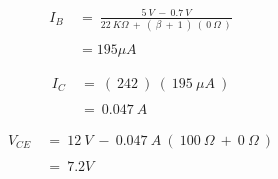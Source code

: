 {\bfseries\itshape{}} 

\begin{flushright}
{\bfseries\itshape{}} \hfill \break
\end{flushright}

\begin{ceqn}
\begin{align}
I_{B}\ &=\ \frac{5\ V\ -\ 0.7\ V}{22\ K\Omega\ +\ (\ \beta\ +\ 1\ )\ (\ 0\ \Omega\ )} \\ \\
&= 195 \mu A
\end{align}
\end{ceqn} \hfill \break

{\bfseries\itshape{}} 

\begin{flushright}
{\bfseries\itshape{}} \hfill \break
\end{flushright}

\begin{ceqn}
\begin{align}
I_{C}\ &=\ (\ 242\ )\ (\ 195\ \mu A\ ) \\ \\
&=\ 0.047\ A
\end{align}
\end{ceqn} \hfill \break

{\bfseries\itshape{}} 

\begin{flushright}
{\bfseries\itshape{}} \hfill \break
\end{flushright}

\begin{ceqn}
\begin{align}
V_{CE}\ &=\ 12\ V\ -\ 0.047\ A\ (\ 100\ \Omega\ +\ 0\ \Omega\ ) \\ \\
&=\ 7.2 V
\end{align}
\end{ceqn} \hfill \break

